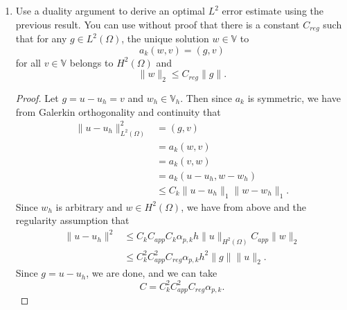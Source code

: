 \documentclass{article}
\begin{document}
\begin{enumerate}
\begin{enumerate}
		      \item
		            Use a duality argument to derive an optimal $L^2$ error estimate using the previous result.
		            You can use without proof that there is a constant $C_{reg}$ such that for any $g \in L^2(\Omega)$, the unique solution $w \in \mathbb V$ to \[a_k(w,v) = (g,v)\] for all $v \in \mathbb V$ belongs to $H^2(\Omega)$ and \[\|w\|_2 \leq C_{reg}\|g\|.\]
		            \begin{proof}
			            Let $g = u-u_h = v$ and $w_h \in \mathbb V_h$.
			            Then since $a_k$ is symmetric, we have from Galerkin orthogonality and continuity that
			            \begin{align*}
				            \|u-u_h\|_{L^2(\Omega)}^2 & = (g,v)                         \\
				                                      & = a_k(w,v)                      \\
				                                      & = a_k(v,w)                      \\
				                                      & = a_k(u-u_h,w-w_h)              \\
				                                      & \leq C_k\|u-u_h\|_1\|w-w_h\|_1.
			            \end{align*}
			            Since $w_h$ is arbitrary and $w \in H^2(\Omega)$, we have from above and the regularity assumption that
			            \begin{align*}
				            \|u-u_h\|^2 & \leq C_kC_{app}C_k\alpha_{p,k}h\|u\|_{H^2(\Omega)}C_{app}\|w\|_2 \\
				                        & \leq C_k^2 C_{app}^2 C_{reg} \alpha_{p,k} h^2 \|g\| \|u\|_2.
			            \end{align*}
			            Since $g = u-u_h$, we are done, and we can take \[C = C_k^2 C_{app}^2 C_{reg}\alpha_{p,k}.\]
		            \end{proof}
	      \end{enumerate}
\end{enumerate}
\end{document}
